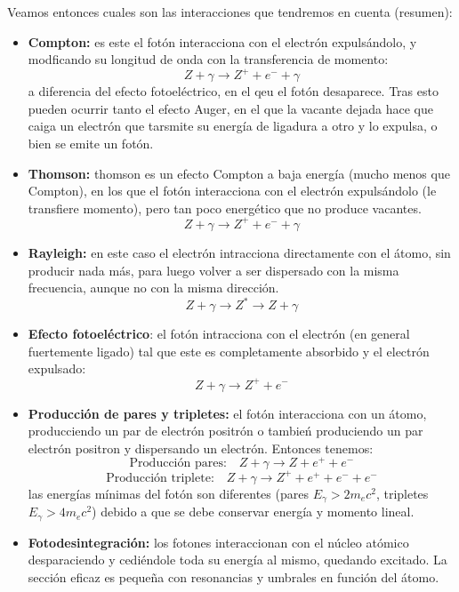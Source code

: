 Veamos entonces cuales son las interacciones que tendremos en cuenta (resumen):
\begin{itemize}
\item \textbf{Compton:} es este el fotón interacciona con el electrón expulsándolo, y modficando su longitud de onda con la transferencia de momento: 
\begin{equation}
    {Z + \gamma \longrightarrow Z^+ +  e^- + \gamma}
\end{equation}
a diferencia del efecto fotoeléctrico, en el qeu el fotón desaparece. Tras esto pueden ocurrir tanto el efecto Auger, en el que la vacante dejada hace que caiga un electrón que tarsmite su energía de ligadura a otro y lo expulsa, o bien se emite un fotón. 
\item \textbf{Thomson:} thomson es un efecto Compton a baja energía (mucho menos que Compton), en los que el fotón interacciona con el electrón expulsándolo (le transfiere momento), pero tan poco energético que no produce vacantes. 
\begin{equation}
    {Z + \gamma \longrightarrow Z^+ +  e^- + \gamma}
\end{equation}
\item \textbf{Rayleigh:} en este caso el electrón intracciona directamente con el átomo, sin producir nada más, para luego volver a ser dispersado con la misma frecuencia, aunque no con la misma dirección. 
\begin{equation}
    {Z + \gamma \longrightarrow Z^* \longrightarrow Z + \gamma }
\end{equation}
\item \textbf{Efecto fotoeléctrico}: el fotón intracciona con el electrón (en general fuertemente ligado) tal que este es completamente absorbido y el electrón expulsado:
\begin{equation}
    {Z+\gamma \longrightarrow Z^+ + e^- }
\end{equation}
\item \textbf{Producción de pares y tripletes:} el fotón interacciona con un átomo, producciendo un par de electrón positrón o tambień produciendo un par electrón positron y dispersando un electrón. Entonces tenemos:
\begin{equation}
    \text{Producción pares:} \quad
    {Z+\gamma \longrightarrow Z + e^+ + e^- } 
\end{equation}
\begin{equation}
     \text{Producción triplete:}  \quad 
    {Z+\gamma \longrightarrow Z^+ +e^+ + e^- + e^- }
\end{equation}
las energías mínimas del fotón son diferentes (pares $E_{\gamma}>2m_ec^2$, tripletes $E_{\gamma}>4m_ec^2$) debido a que se debe conservar energía y momento lineal. 
\item \textbf{Fotodesintegración:} los fotones interaccionan con el núcleo atómico desparaciendo y cediéndole toda su energía al mismo, quedando excitado. La sección eficaz es pequeña con resonancias y umbrales en función del átomo. 
\end{itemize}



